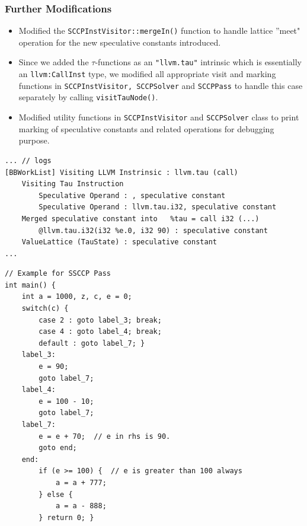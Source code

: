 \documentclass{beamer}
\begin{document}
\begin{frame}[fragile]
	\frametitle{Further Modifications}
	\begin{itemize}
		\item Modified the \texttt{SCCPInstVisitor::mergeIn()} function to handle lattice ''meet" operation for the new speculative constants introduced.  
		\item Since we added the $\tau$-functions as an \texttt{"llvm.tau"} intrinsic which is essentially an \texttt{llvm:CallInst} type, we modified all appropriate visit and marking functions in \texttt{SCCPInstVisitor, SCCPSolver} and \texttt{SCCPPass} to handle this case separately by calling \texttt{visitTauNode()}.
		\item Modified utility functions in \texttt{SCCPInstVisitor} and \texttt{SCCPSolver} class to print marking of speculative constants and related operations for debugging purpose.
	\end{itemize}
\begin{verbatim}
... // logs
[BBWorkList] Visiting LLVM Instrinsic : llvm.tau (call)
	Visiting Tau Instruction
		Speculative Operand : , speculative constant
		Speculative Operand : llvm.tau.i32, speculative constant
	Merged speculative constant into   %tau = call i32 (...) 
		@llvm.tau.i32(i32 %e.0, i32 90) : speculative constant
	ValueLattice (TauState) : speculative constant
...
\end{verbatim}
\end{frame}
\footnotesize
\begin{frame}[fragile]
\begin{verbatim}
// Example for SSCCP Pass
int main() {
	int a = 1000, z, c, e = 0;
	switch(c) {   
		case 2 : goto label_3; break;
		case 4 : goto label_4; break;
		default : goto label_7; }
	label_3:
		e = 90;
		goto label_7;
	label_4:
		e = 100 - 10;
		goto label_7;
	label_7:
		e = e + 70;  // e in rhs is 90.
		goto end;
	end:
		if (e >= 100) {  // e is greater than 100 always
			a = a + 777;
		} else {
			a = a - 888;
		} return 0; }
\end{verbatim}
\end{frame}
\end{document}

